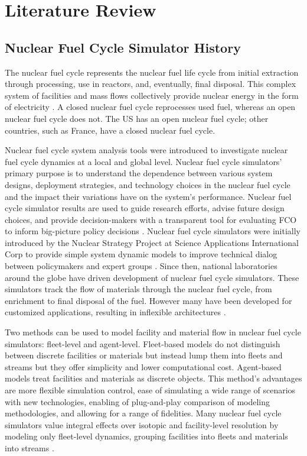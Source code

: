 \chapter{Literature Review}

\section{Nuclear Fuel Cycle Simulator History}
The nuclear fuel cycle represents the nuclear fuel life cycle from initial
extraction through processing, use in reactors, and, eventually, 
final disposal.
This complex system of facilities and mass flows 
collectively provide nuclear energy 
in the form of electricity \cite{yacout_modeling_2005}.
A closed nuclear fuel cycle reprocesses used fuel, whereas an open 
nuclear fuel cycle does not.  
The US has an open nuclear fuel cycle; other countries, such as France, 
have a closed nuclear fuel cycle. 

Nuclear fuel cycle system analysis tools were introduced to investigate 
nuclear fuel cycle dynamics at a local and global level. 
Nuclear fuel cycle simulators' primary purpose   
is to understand the dependence between various system designs, deployment 
strategies, and technology choices
in the nuclear fuel cycle and the impact their variations have on 
the system's performance. 
Nuclear fuel cycle simulator results are used to guide research 
efforts, advise future design choices, and provide 
decision-makers with a transparent tool for evaluating \gls{FCO} 
to inform big-picture policy decisions \cite{yacout_modeling_2005}.
Nuclear fuel cycle simulators were initially introduced 
by the Nuclear Strategy Project at Science Applications International Corp 
to provide simple system dynamic models to improve technical dialog between 
policymakers and expert groups \cite{yacout_modeling_2005}.
Since then, national laboratories around the globe have driven 
development of nuclear fuel cycle simulators. 
These simulators track the flow of materials through the nuclear fuel cycle, 
from enrichment to final disposal of the fuel. 
However many have been developed for customized applications, resulting in 
inflexible architectures \cite{huff_fundamental_2016}.  

Two methods can be used to model facility and material flow in 
nuclear fuel cycle simulators: fleet-level and agent-level.  
Fleet-based models do not distinguish between discrete facilities 
or materials but instead lump them into fleets and streams but they 
offer simplicity and lower computational cost. 
Agent-based models treat facilities and materials as discrete 
objects. 
This method's advantages are more flexible simulation control,
ease of simulating a wide range of scenarios with new 
technologies, enabling of plug-and-play comparison of modeling 
methodologies, and allowing for a range of fidelities.  
Many nuclear fuel cycle simulators value integral effects over isotopic and 
facility-level resolution by modeling only fleet-level dynamics,
grouping facilities into fleets and materials into streams \cite{huff_fundamental_2016}.

